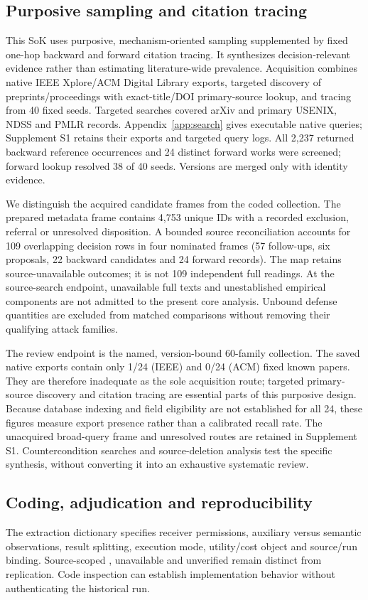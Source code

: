\subsection{Purposive sampling and citation tracing}
This SoK uses purposive, mechanism-oriented sampling supplemented by fixed one-hop backward and forward citation tracing. It synthesizes decision-relevant evidence rather than estimating literature-wide prevalence. Acquisition combines native IEEE Xplore/ACM Digital Library exports, targeted discovery of preprints/proceedings with exact-title/DOI primary-source lookup, and tracing from 40 fixed seeds. Targeted searches covered arXiv and primary USENIX, NDSS and PMLR records. Appendix~\ref{app:search} gives executable native queries; Supplement S1 retains their exports and targeted query logs. All 2,237 returned backward reference occurrences and 24 distinct forward works were screened; forward lookup resolved 38 of 40 seeds. Versions are merged only with identity evidence.

We distinguish the acquired candidate frames from the coded collection. The prepared metadata frame contains 4,753 unique IDs with a recorded exclusion, referral or unresolved disposition. A bounded source reconciliation accounts for 109 overlapping decision rows in four nominated frames (57 follow-ups, six proposals, 22 backward candidates and 24 forward records). The map retains source-unavailable outcomes; it is not 109 independent full readings. At the source-search endpoint, unavailable full texts and unestablished empirical components are not admitted to the present core analysis. Unbound defense quantities are excluded from matched comparisons without removing their qualifying attack families.

The review endpoint is the named, version-bound 60-family collection. The saved native exports contain only 1/24 (IEEE) and 0/24 (ACM) fixed known papers. They are therefore inadequate as the sole acquisition route; targeted primary-source discovery and citation tracing are essential parts of this purposive design. Because database indexing and field eligibility are not established for all 24, these figures measure export presence rather than a calibrated recall rate. The unacquired broad-query frame and unresolved routes are retained in Supplement S1. Countercondition searches and source-deletion analysis test the specific synthesis, without converting it into an exhaustive systematic review.

\subsection{Coding, adjudication and reproducibility}
The extraction dictionary specifies receiver permissions, auxiliary versus semantic observations, result splitting, execution mode, utility/cost object and source/run binding. Source-scoped \NRR{}, unavailable \NRA{} and unverified \NRV{} remain distinct from replication. Code inspection can establish implementation behavior without authenticating the historical run.

